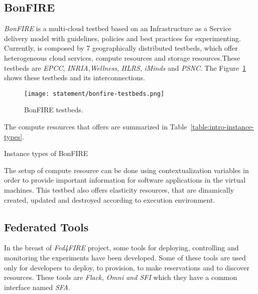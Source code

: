 \subsection{BonFIRE}

\emph{BonFIRE} is a multi-cloud testbed based on an Infrastructure as a Service
delivery model with guidelines, policies and best practices for
experimenting. Currently, \bonfire is composed by 7 geographically distributed
testbeds, which offer heterogeneous cloud services, compute resources and
storage resources.These testbeds are \emph{EPCC},\emph{ INRIA},\emph{Wellness},\emph{ HLRS}, \emph{iMinds} and \emph{PSNC}. The Figure~\ref{fig:intr-bonfire-testbeds} shows these testbeds and its interconnections.

\begin{figure}[!h]
\begin{center}
\texttt{[image: statement/bonfire-testbeds.png]}
\caption{BonFIRE testbeds.}
\label{fig:intr-bonfire-testbeds}
\end{center}
\end{figure}

The compute resources that \bonfire offers are summarized in Table~\ref{table:intro-instance-types}.

\begin{table}[hp]
  \centering
  {\small
  
  }
  \caption{Instance types of BonFIRE}
  \label{table:intro-instance-types}
\end{table}

The setup of compute resource can be done using contextualization variables in
order to provide important information for software applications in the virtual
machines. 
This testbed also offers elasticity resources, that are dinamically created,
updated and destroyed according to execution environment.


\subsection{Federated Tools}

In the breast of \emph{Fed4FIRE} project, some tools for deploying, controlling and
monitoring the experiments have been developed. 
Some of these tools are used only for developers to deploy, to provision, to
make reservations and to discover resources. These tools are \emph{Flack, Omni
  and SFI} which they have a common interface named \emph{SFA}.

